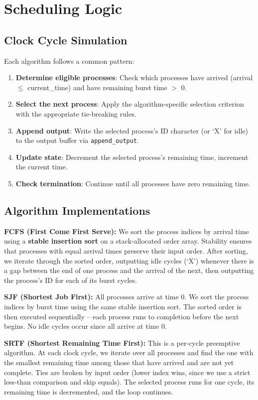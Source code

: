 \documentclass[a4paper,12pt]{article}
\begin{document}
\section{Scheduling Logic}

\subsection{Clock Cycle Simulation}

Each algorithm follows a common pattern:
\begin{enumerate}
    \item \textbf{Determine eligible processes}: Check which processes have arrived (arrival $\leq$ current\_time) and have remaining burst time $>$ 0.
    \item \textbf{Select the next process}: Apply the algorithm-specific selection criterion with the appropriate tie-breaking rules.
    \item \textbf{Append output}: Write the selected process's ID character (or `X' for idle) to the output buffer via \texttt{append\_output}.
    \item \textbf{Update state}: Decrement the selected process's remaining time, increment the current time.
    \item \textbf{Check termination}: Continue until all processes have zero remaining time.
\end{enumerate}

\subsection{Algorithm Implementations}

\textbf{FCFS (First Come First Serve):}
We sort the process indices by arrival time using a \textbf{stable insertion sort} on a stack-allocated order array. Stability ensures that processes with equal arrival times preserve their input order. After sorting, we iterate through the sorted order, outputting idle cycles (`X') whenever there is a gap between the end of one process and the arrival of the next, then outputting the process's ID for each of its burst cycles.

\textbf{SJF (Shortest Job First):}
All processes arrive at time 0. We sort the process indices by burst time using the same stable insertion sort. The sorted order is then executed sequentially -- each process runs to completion before the next begins. No idle cycles occur since all arrive at time 0.

\textbf{SRTF (Shortest Remaining Time First):}
This is a per-cycle preemptive algorithm. At each clock cycle, we iterate over all processes and find the one with the smallest remaining time among those that have arrived and are not yet complete. Ties are broken by input order (lower index wins, since we use a strict less-than comparison and skip equals). The selected process runs for one cycle, its remaining time is decremented, and the loop continues.
\end{document}
